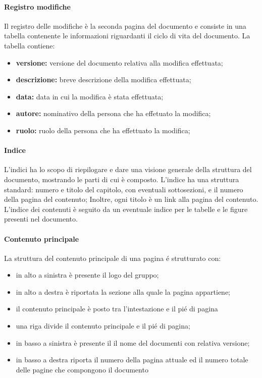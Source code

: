 			\paragraph{Registro modifiche}
				Il registro delle modifiche è la seconda pagina del documento e consiste in una tabella contenente le informazioni riguardanti il ciclo di vita del documento. La tabella contiene:
				\begin{itemize}
					\item \textbf{versione:} versione del documento relativa alla modifica effettuata;
					\item \textbf{descrizione:} breve descrizione della modifica effettuata;
					\item \textbf{data:} data in cui la modifica è stata effettuata;
					\item \textbf{autore:} nominativo della persona che ha effetuato la modifica;
					\item \textbf{ruolo:} ruolo della persona che ha effettuato la modifica;
				\end{itemize}
			\paragraph{Indice}
				L'indici ha lo scopo di riepilogare e dare una visione generale della struttura del documento, mostrando le parti di cui è composto. L'indice ha una struttura standard: numero e titolo del capitolo, con eventuali sottosezioni, e il numero della pagina del contenuto; Inoltre, ogni titolo è un link alla pagina del contenuto. L'indice dei contenuti è seguito da un eventuale indice per le tabelle e le figure presenti nel documento.
			\paragraph{Contenuto principale}
				La struttura del contenuto principale di una pagina é strutturato con:
					\begin{itemize}
						\item in alto a sinistra è presente il logo del gruppo;
						\item in alto a destra è riportata la sezione alla quale la pagina appartiene;
						\item il contenuto principale è posto tra l'intestazione e il pié di pagina
						\item una riga divide il contenuto principale e il pié di pagina;
						\item in basso a sinistra è presente il il nome del documenti con relativa versione;
						\item in basso a destra riporta il numero della pagina attuale ed il numero totale delle pagine che compongono il documento
					\end{itemize}
